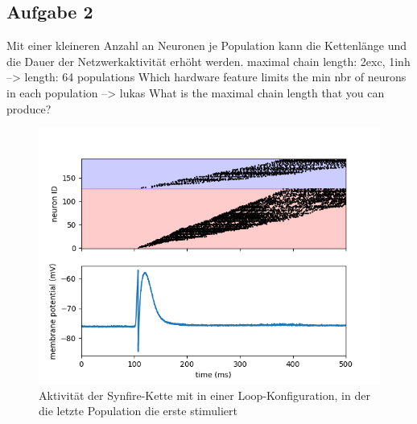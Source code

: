 \documentclass[10pt,a4paper]{scrartcl}
\begin{document}
\newpage 


\subsection{Aufgabe 2}
Mit einer kleineren Anzahl an Neuronen je Population kann die Kettenlänge und die Dauer der Netzwerkaktivität erhöht werden.
maximal chain length: 2exc, 1inh --> length: 64 populations
Which hardware feature limits the min nbr of neurons in each population --> lukas
What is the maximal chain length that you can produce?


\begin{figure} [ht]
\begin{center}
\label{fig:abb4}
\caption{Aktivität der Synfire-Kette mit in einer Loop-Konfiguration, in der die letzte Population die erste stimuliert}
\includegraphics[scale=0.35]{pictures/chainlength_64.png}
\end{center}
\end{figure}
\end{document}
